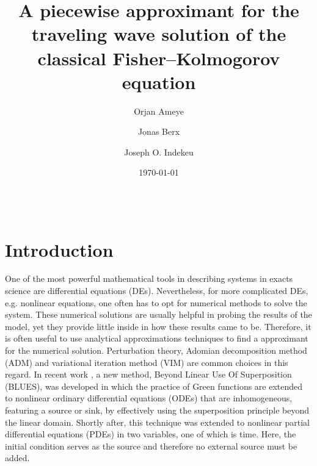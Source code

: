 \documentclass[amsmath,amssymb,amsfonts,aps,pre,preprint,superscriptaddress,bibnotes,showpacs,showkeys,longbibliography]{revtex4-1}
\begin{document}
\title{A piecewise approximant for the traveling wave solution of the classical Fisher–Kolmogorov equation}

\author{Orjan Ameye}

\author{Jonas Berx}

\author{Joseph O. Indekeu}

\date{\today}

\begin{abstract}
\lipsum[2-3]\\
\end{abstract}

\maketitle

\section{Introduction}\label{sec:intro}
One of the most powerful mathematical tools in describing systems in exacts science are differential equations (DEs). Nevertheless, for more complicated DEs, e.g. nonlinear equations, one often has to opt for numerical methods to solve the system. These numerical solutions are usually helpful in probing the results of the model, yet they provide little inside in how these results came to be. Therefore, it is often useful to use analytical approximations techniques to find a approximant for the numerical solution. Perturbation theory, Adomian decomposition method (ADM) and variational iteration method (VIM) are common choices in this regard. In recent work \cite{Berx_2020,Berx_2019}, a new method, Beyond Linear Use Of Superposition (BLUES), was developed in which the practice of Green functions are extended to nonlinear ordinary differential equations (ODEs) that are inhomogeneous, featuring a source or sink, by effectively using the superposition principle beyond the linear domain. Shortly after, this technique was extended to nonlinear partial differential equations (PDEs) \cite{Berx_2021} in two variables, one of which is time. Here, the initial condition serves as the source and therefore no external source must be added.
\end{document}
